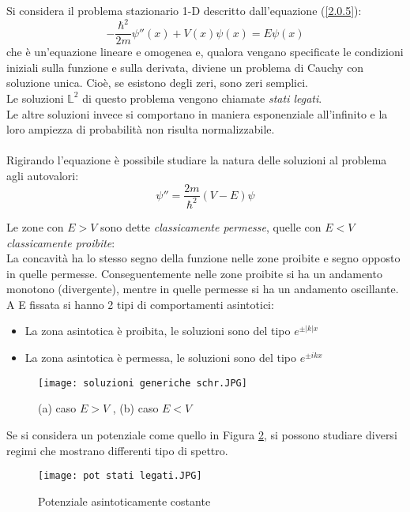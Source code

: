 \documentclass[twoside]{article}
\begin{document}
Si considera il problema stazionario 1-D descritto dall'equazione (\ref{2.0.5}):
\begin{equation}
    -\frac{\hbar ^2}{2m}\psi''(x) + V(x)\psi(x)=E\psi(x) 
\end{equation}
che è un'equazione lineare e omogenea e, qualora vengano specificate le condizioni iniziali sulla funzione e sulla derivata, diviene un problema di Cauchy con soluzione unica. Cioè, se esistono degli zeri, sono zeri semplici.
\\
Le soluzioni $\mathds{L}^2$ di questo problema vengono chiamate \textit{stati legati}. \\
Le altre soluzioni invece si comportano in maniera esponenziale all'infinito e la loro ampiezza di probabilità non risulta normalizzabile.
\\ \\
Rigirando l'equazione è possibile studiare la natura delle soluzioni al problema agli autovalori:
\begin{equation}
    \psi''=\frac{2m}{\hbar ^2}(V-E)\psi
\end{equation}

Le zone con $E>V$ sono dette \textit{classicamente permesse}, quelle con $E<V$ \textit{classicamente proibite}:
\\
La concavità ha lo stesso segno della funzione nelle zone proibite e segno opposto in quelle permesse.
Conseguentemente nelle zone proibite si ha un andamento monotono (divergente), mentre in quelle permesse si ha un andamento oscillante.
\\
A E fissata si hanno 2 tipi di comportamenti asintotici:
\begin{itemize}
    \item La zona asintotica è proibita, le soluzioni sono del tipo $e^{\pm|k|x}$
    \item La zona asintotica è permessa, le soluzioni sono del tipo $e^{\pm ikx}$
\end{itemize}

\begin{figure}[ht]
\centering
\texttt{[image: soluzioni generiche schr.JPG]}
\caption{(a) caso $E>V$ , (b) caso $E<V$}
\label{schr}
\end{figure}

Se si considera un potenziale come quello in Figura \ref{pot}, si possono studiare diversi regimi che mostrano differenti tipo di spettro.

\begin{figure}[ht]
\centering
\texttt{[image: pot stati legati.JPG]}
\caption{Potenziale asintoticamente costante}
\label{pot}
\end{figure}
\end{document}
